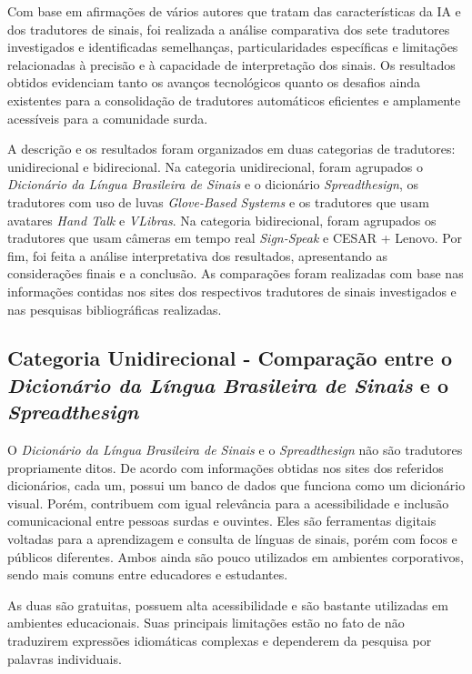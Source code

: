 \documentclass[portuguese]{textolivre}
\begin{document}
Com base em afirmações de vários autores que tratam das características da IA e dos tradutores de sinais, foi realizada a análise comparativa dos sete tradutores investigados e identificadas semelhanças, particularidades específicas e limitações relacionadas à precisão e à capacidade de interpretação dos sinais. Os resultados obtidos evidenciam tanto os avanços tecnológicos quanto os desafios ainda existentes para a consolidação de tradutores automáticos eficientes e amplamente acessíveis para a comunidade surda.

A descrição e os resultados foram organizados em duas categorias de tradutores: unidirecional e bidirecional. Na categoria unidirecional, foram agrupados o \textit{Dicionário da Língua Brasileira de Sinais} e o dicionário \textit{Spreadthesign}, os tradutores com uso de luvas \textit{Glove-Based Systems} e os tradutores que usam avatares \textit{Hand Talk} e \textit{VLibras}. Na categoria bidirecional, foram agrupados os tradutores que usam câmeras em tempo real \textit{Sign-Speak} e CESAR + Lenovo. Por fim, foi feita a análise interpretativa dos resultados, apresentando as considerações finais e a conclusão. As comparações foram realizadas com base nas informações contidas nos sites dos respectivos tradutores de sinais investigados e nas pesquisas bibliográficas realizadas.

\subsection{Categoria Unidirecional - Comparação entre o \textit{Dicionário da Língua Brasileira de Sinais} e o \textit{Spreadthesign}}

O \textit{Dicionário da Língua Brasileira de Sinais} e o \textit{Spreadthesign} não são tradutores propriamente ditos. De acordo com informações obtidas nos sites dos referidos dicionários, cada um, possui um banco de dados que funciona como um dicionário visual. Porém, contribuem com igual relevância para a acessibilidade e inclusão comunicacional entre pessoas surdas e ouvintes. Eles são ferramentas digitais voltadas para a aprendizagem e consulta de línguas de sinais, porém com focos e públicos diferentes. Ambos ainda são pouco utilizados em ambientes corporativos, sendo mais comuns entre educadores e estudantes.

As duas são gratuitas, possuem alta acessibilidade e são bastante utilizadas em ambientes educacionais. Suas principais limitações estão no fato de não traduzirem expressões idiomáticas complexas e dependerem da pesquisa por palavras individuais.
\end{document}
